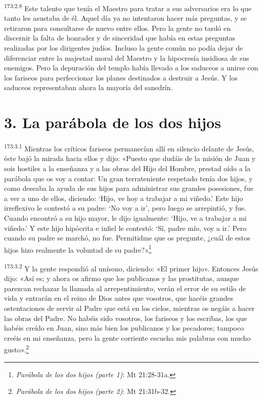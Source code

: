 \par
\textsuperscript{173:2.8} Este talento que tenía el Maestro para tratar a sus adversarios era lo que tanto les asustaba de él. Aquel día ya no intentaron hacer más preguntas, y se retiraron para consultarse de nuevo entre ellos. Pero la gente no tardó en discernir la falta de honradez y de sinceridad que había en estas preguntas realizadas por los dirigentes judíos. Incluso la gente común no podía dejar de diferenciar entre la majestad moral del Maestro y la hipocresía insidiosa de sus enemigos. Pero la depuración del templo había llevado a los saduceos a unirse con los fariseos para perfeccionar los planes destinados a destruir a Jesús. Y los saduceos representaban ahora la mayoría del sanedrín.

\section*{3. La parábola de los dos hijos}
\par
\textsuperscript{173:3.1} Mientras los críticos fariseos permanecían allí en silencio delante de Jesús, éste bajó la mirada hacia ellos y dijo: «Puesto que dudáis de la misión de Juan y sois hostiles a la enseñanza y a las obras del Hijo del Hombre, prestad oído a la parábola que os voy a contar: Un gran terrateniente respetado tenía dos hijos, y como deseaba la ayuda de sus hijos para administrar sus grandes posesiones, fue a ver a uno de ellos, diciendo: `Hijo, ve hoy a trabajar a mi viñedo.' Este hijo irreflexivo le contestó a su padre: `No voy a ir', pero luego se arrepintió, y fue. Cuando encontró a su hijo mayor, le dijo igualmente: `Hijo, ve a trabajar a mi viñedo.' Y este hijo hipócrita e infiel le contestó: `Sí, padre mío, voy a ir.' Pero cuando su padre se marchó, no fue. Permitidme que os pregunte, ¿cuál de estos hijos hizo realmente la voluntad de su padre?»\footnote{\textit{Parábola de los dos hijos (parte 1)}: Mt 21:28-31a.}

\par
\textsuperscript{173:3.2} Y la gente respondió al unísono, diciendo: «El primer hijo». Entonces Jesús dijo: «Así es; y ahora os afirmo que los publicanos y las prostitutas, aunque parezcan rechazar la llamada al arrepentimiento, verán el error de su estilo de vida y entrarán en el reino de Dios antes que vosotros, que hacéis grandes ostentaciones de servir al Padre que está en los cielos, mientras os negáis a hacer las obras del Padre. No habéis sido vosotros, los fariseos y los escribas, los que habéis creído en Juan, sino más bien los publicanos y los pecadores; tampoco creéis en mi enseñanza, pero la gente corriente escucha mis palabras con mucho gusto».\footnote{\textit{Parábola de los dos hijos (parte 2)}: Mt 21:31b-32.}

